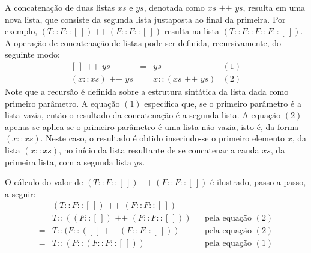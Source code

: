 \begin{Definition}\label{def:concat:lists}
A concatenação de duas listas $xs$ e $ys$, denotada como $xs\text{ ++ }ys$, resulta em uma nova lista,
que consiste da segunda lista justaposta ao final da primeira. Por exemplo,  $(T :: F :: [\,])\,\text{++}\,(F :: F :: [\,])$ resulta na lista $(T :: F :: F :: F :: [\,])$. A operação de concatenação de listas pode ser definida, recursivamente, do seguinte modo:
 \[
  \begin{array}{lclr}
    [\,] \text { ++ } ys & = & ys & (1)\\
    (x :: xs) \text{ ++ }  ys & = & x :: (xs\text{ ++ } ys) & (2)
  \end{array}
  \]
Note que a recursão é definida sobre a estrutura sint\'atica da lista dada como primeiro par\^ametro. A equa\c{c}\~ao $(1)$ especifica que, se o primeiro parâmetro é a lista vazia, ent\~ao o resultado da concatena\c{c}\~ao \'e a segunda lista. A equa\c{c}\~ao $(2)$ apenas se aplica se o primeiro parâmetro é uma lista não vazia, isto é, da forma $(x :: xs)$. Neste caso, o resultado \'e obtido inserindo-se o primeiro elemento $x$, da lista $(x :: xs)$, no in\'icio da lista resultante de se concatenar a cauda $xs$, da primeira lista, com a segunda lista $ys$.
\end{Definition}

\begin{Example}
O cálculo do valor de $(T :: F :: [\,])\,\text{++}\,(F :: F :: [\,])$ é ilustrado, passo a passo, a seguir:
\[
\begin{array}{llcl}
& (T :: F :: [\,]) \text{ ++ } (F :: F ::[\,])       & & \\
= & T :: ((F :: [\,]) \text{ ++ } (F :: F ::[\,])) &  & \text{pela equa\c{c}\~ao }(2)\\
= & T :: (F :: ([\,] \text{ ++ } (F :: F ::[\,]))  &  & \text{pela equa\c{c}\~ao }(2)\\
= & T :: (F :: (F :: F ::[\,]))                          &  & \text{pela equa\c{c}\~ao }(1)\\
\end{array}
\]
\end{Example}

